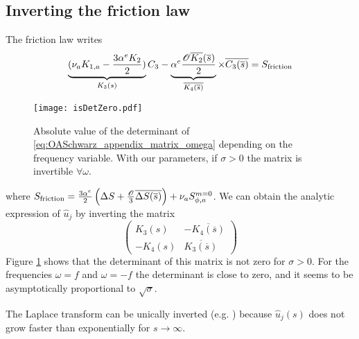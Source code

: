 \subsection{Inverting the friction law}
The friction law writes
\begin{equation}
	\underbrace{(\nu_a K_{1,a} - \frac{3\alpha^e K_{2}}{2})}_{
		K_3(s)
	}{C}_3
	-\underbrace{
		\alpha^e \frac{{\cal O} \overline{K_2}(\overline{s})}{2}}_{
		\overline{K_4(\overline{s})}}
	\times \overline{{C}_3(\overline{s})}
	= S_{\rm friction}
\end{equation}
\begin{figure}
    \centering
    \texttt{[image: isDetZero.pdf]}
    \caption{Absolute value of the determinant of
	\eqref{eq:OASchwarz_appendix_matrix_omega} depending on
	the frequency variable. With our parameters,
	if $\sigma>0$ the matrix is invertible $\forall \omega$.}
    \label{fig:OASchwarz_isDetZero}
\end{figure}
where $S_{\rm friction} =
	\frac{3\alpha^e}{2} \left(
	\Delta S + \frac{\cal O}{3}
	\overline{\Delta S(\overline{s})}\right)
	+\nu_a S_{\phi,a}^{m=0}$.
We can obtain the analytic expression of $\widehat{u}_j$
by inverting the matrix
\begin{equation}
	\label{eq:OASchwarz_appendix_matrix_omega}
	\begin{pmatrix}
		K_3(s)& - \overline{K_4(\overline{s})}\\
		-K_4(s) & \overline{K_3(\overline{s})}
	\end{pmatrix}
\end{equation}
Figure \ref{fig:OASchwarz_isDetZero} shows that the determinant of
this matrix is not zero for $\sigma>0$. For the frequencies
$\omega=f$ and $\omega=-f$ the determinant is close to zero, and
it seems to be asymptotically proportional to $\sqrt{\sigma}$.
\par
The Laplace transform can be unically inverted
(e.g. \citep{cohen_inversion_2007}) because
$\widehat{u}_j(s)$ does not grow faster than exponentially
for $s\rightarrow \infty$. 
